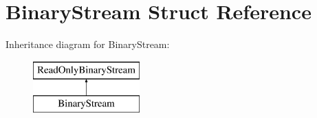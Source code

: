 \hypertarget{struct_binary_stream}{}\section{Binary\+Stream Struct Reference}
\label{struct_binary_stream}
Inheritance diagram for Binary\+Stream\+:\begin{figure}[H]
\begin{center}
\leavevmode
\includegraphics[height=2.000000cm]{struct_binary_stream}
\end{center}
\end{figure}
